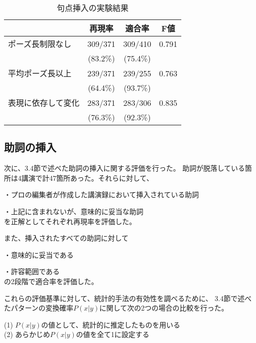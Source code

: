 \begin{table}[t]
\small
\caption{句点挿入の実験結果}
\centering
 \begin{tabular}{|l||c|c|c|}
\hline
			&再現率			&適合率		&F値		\\\hline\hline
ポーズ長制限なし	& 309/371		& 309/410	&0.791		\\
			& (83.2\%)		& (75.4\%)	&		\\\hline
平均ポーズ長以上	& 239/371		& 239/255	&0.763		\\
			& (64.4\%)		& (93.7\%)	&		\\\hline
表現に依存して変化	& 283/371		& 283/306	&0.835		\\
			& (76.3\%)		& (92.3\%)	&		\\\hline	
 \end{tabular}
 \label{pause}
\vspace{-3.0mm}
\end{table}

\subsection{助詞の挿入}

次に、3.4節で述べた助詞の挿入に関する評価を行った。
助詞が脱落している箇所は4講演で計47箇所あった。それらに対して、

・プロの編集者が作成した講演録において挿入されている助詞

・上記に含まれないが、意味的に妥当な助詞 \\
を正解としてそれぞれ再現率を評価した。

また、挿入されたすべての助詞に対して

・意味的に妥当である

・許容範囲である \\
の2段階で適合率を評価した。

これらの評価基準に対して、統計的手法の有効性を調べるために、
3.4節で述べたパターンの変換確率$P(x|y)$に関して次の2つの場合の比較を行った。
\begin{description}
\item[(1) $P(x|y)$の値として、統計的に推定したものを用いる]
\item[(2) あらかじめ$P(x|y)$の値を全て1に設定する]
\end{description}

